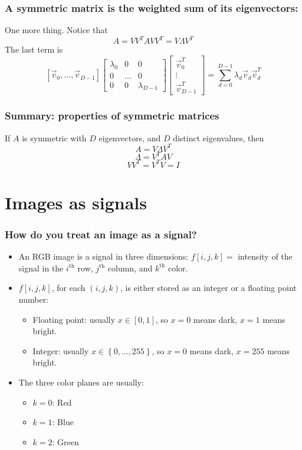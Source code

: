 \documentclass{beamer}
\begin{document}
\begin{frame}
  \frametitle{A symmetric matrix is the weighted sum of its eigenvectors:}
  One more thing.  Notice that
  \[
  A = VV^TAVV^T =V\Lambda V^T
  \]
  The last term is
  \[
  \left[\vec{v}_0,\ldots,\vec{v}_{D-1}\right]
  \left[\begin{array}{ccc}\lambda_0&0&0\\0&\ldots&0\\0&0&\lambda_{D-1}\end{array}\right]  
  \left[\begin{array}{c}\vec{v}_0^T\\\vdots\\\vec{v}_{D-1}^T\end{array}\right]=
  \sum_{d=0}^{D-1}\lambda_d \vec{v}_d\vec{v}_d^T
  \]
\end{frame}

\begin{frame}
  \frametitle{Summary: properties of symmetric matrices}
  If $A$ is symmetric with $D$ eigenvectors, and $D$ distinct eigenvalues, then
  \[
  A=V\Lambda V^T
  \]
  \[
  \Lambda = V^TAV
  \]
  \[
  VV^T=V^TV=I
  \]
\end{frame}


\section[Images]{Images as signals}
\setcounter{subsection}{1}

\begin{frame}
  \frametitle{How do you treat an image as a signal?}
  \begin{itemize}
  \item
    An RGB image is a signal in three dimensions: $f[i,j,k]=$
    intensity of the signal in the $i^{\textrm{th}}$ row,
    $j^{\textrm{th}}$ column, and $k^{\textrm{th}}$ color.
  \item
    $f[i,j,k]$, for each $(i,j,k)$, is either stored as an integer or
    a floating point number:
    \begin{itemize}
    \item Floating point: usually $x\in[0,1]$, so $x=0$ means dark,
      $x=1$ means bright.
    \item Integer: usually $x\in\left\{0,\ldots,255\right\}$, so
      $x=0$ means dark, $x=255$ means bright.
    \end{itemize}
  \item The three color planes are usually:
    \begin{itemize}
    \item $k=0$: Red
    \item $k=1$: Blue
    \item $k=2$: Green
    \end{itemize}
  \end{itemize}
\end{frame}
    
\end{document}
